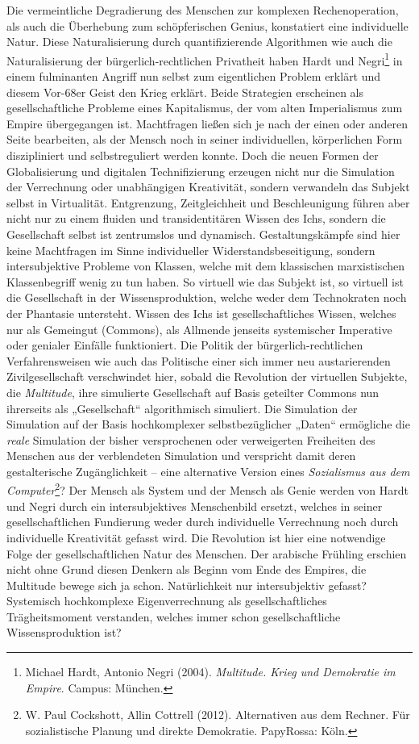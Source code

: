 \documentclass[a4paper,11pt]{article}
\begin{document}
Die vermeintliche Degradierung des Menschen zur komplexen Rechenoperation, als
auch die Überhebung zum schöpferischen Genius, konstatiert eine individuelle
Natur. Diese Naturalisierung durch quantifizierende Algorithmen wie auch die
Naturalisierung der bürgerlich-rechtlichen Privatheit haben Hardt und
Negri\footnote{Michael Hardt, Antonio Negri (2004). \emph{Multitude.  Krieg
    und Demokratie im Empire}.  Campus: München. } in einem fulminanten
Angriff nun selbst zum eigentlichen Problem erklärt und diesem Vor-68er Geist
den Krieg erklärt. Beide Strategien erscheinen als gesellschaftliche Probleme
eines Kapitalismus, der vom alten Imperialismus zum Empire übergegangen ist.
Machtfragen ließen sich je nach der einen oder anderen Seite bearbeiten, als
der Mensch noch in seiner individuellen, körperlichen Form diszipliniert und
selbstreguliert werden konnte. Doch die neuen Formen der Globalisierung und
digitalen Technifizierung erzeugen nicht nur die Simulation der Verrechnung
oder unabhängigen Kreativität, sondern verwandeln das Subjekt selbst in
Virtualität.  Entgrenzung, Zeitgleichheit und Beschleunigung führen aber nicht
nur zu einem fluiden und trans\-identitären Wissen des Ichs, sondern die
Gesellschaft selbst ist zentrumslos und dynamisch.  Gestaltungskämpfe sind
hier keine Machtfragen im Sinne individueller Widerstandsbeseitigung, sondern
intersubjektive Probleme von Klassen, welche mit dem klassischen marxistischen
Klassenbegriff wenig zu tun haben. So virtuell wie das Subjekt ist, so
virtuell ist die Gesellschaft in der Wissensproduktion, welche weder dem
Technokraten noch der Phantasie untersteht. Wissen des Ichs ist
gesellschaftliches Wissen, welches nur als Gemeingut (Commons), als Allmende
jenseits systemischer Imperative oder genialer Einfälle funktioniert.  Die
Politik der bürgerlich-rechtlichen Verfahrensweisen wie auch das Politische
einer sich immer neu austarierenden Zivilgesellschaft verschwindet hier,
sobald die Revolution der virtuellen Subjekte, die \emph{Multitude}, ihre
simulierte Gesellschaft auf Basis geteilter Commons nun ihrerseits als
„Gesellschaft“ algorithmisch simuliert. Die Simulation der Simulation auf der
Basis hochkomplexer selbstbezüglicher „Daten“ ermögliche die \emph{reale}
Simulation der bisher versprochenen oder verweigerten Freiheiten des Menschen
aus der verblendeten Simulation und verspricht damit deren gestalterische
Zugänglichkeit -- eine alternative Version eines \emph{Sozialismus aus dem
  Computer}\footnote{W. Paul Cockshott, Allin Cottrell (2012). Alternativen
  aus dem Rechner. Für sozialistische Planung und direkte
  Demokratie. PapyRossa: Köln.}? Der Mensch als System und der Mensch als
Genie werden von Hardt und Negri durch ein intersubjektives Menschenbild
ersetzt, welches in seiner gesellschaftlichen Fundierung weder durch
individuelle Verrechnung noch durch individuelle Kreativität gefasst wird. Die
Revolution ist hier eine notwendige Folge der gesellschaftlichen Natur des
Menschen. Der arabische Frühling erschien nicht ohne Grund diesen Denkern als
Beginn vom Ende des Empires, die Multitude bewege sich ja schon.
Natürlichkeit nur intersubjektiv gefasst? Systemisch hochkomplexe
Eigenverrechnung als gesellschaftliches Trägheitsmoment verstanden, welches
immer schon gesellschaftliche Wissensproduktion ist?
\end{document}
